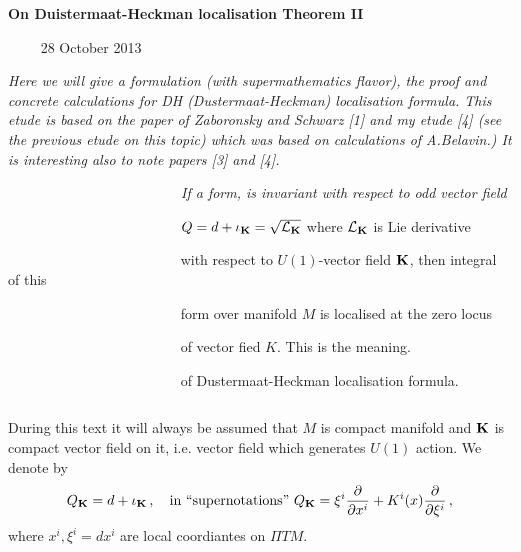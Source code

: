
\def\vare {\varepsilon}
\def\A {{\bf A}}
\def\FF {{\bf F}}
\def\a {\alpha}
\def\K {{\bf K}}
\def\s {{\sigma}}
\def\p{\partial}
\def\vare{{\varepsilon}}
\def\L {{\cal L}}
\def\G {{\Gamma}}
\def\C {{\bf C}}
\def\Z {{\bf Z}}
\def\U  {{\cal U}}
\def\R  {{\bf R}}
\def\E  {{\bf E}}
\def\l {\lambda}
\def\degree {{\bf {\rm degree}\,\,}}
\def \finish {${\,\,\vrule height1mm depth2mm width 8pt}$}
\def \m {\medskip}
\def\r {{\bf r}}
\def\v {{\bf v}}
\def\n {{\bf n}}
\def\b {{\bf b}}
\def\ss  {{\bf s }}
\def\e{{\bf e}}
\def\ac {{\bf a}}
\def \X   {{\bf X}}
\def \Y   {{\bf Y}}
\def \x   {{\bf x}}
\def \y   {{\bf y}}
\def\w {{\omega}} 
\def\wv {{\buildrel \rightarrow\over \omega}}

\def\K{{\bf K}}
\def\locus {\hbox{locus of $\K$}}


\centerline {\bf On Duistermaat-Heckman localisation Theorem II}

  \bigskip

$\qquad$ 28 October 2013

\m

{\it
   Here we will give a formulation (with supermathematics flavor),
the proof and concrete calculations
for DH (Dustermaat-Heckman) localisation formula. This etude is based
on the paper of  Zaboronsky and Schwarz [1] and my etude
[4] (see the previous etude on this topic) which was based on calculations 
of A.Belavin.) It is interesting also to note papers [3] and [4].
}

      \medskip
{\sl
  $\qquad\qquad$$\qquad\qquad$$\qquad\qquad$ If a form, 
  is invariant with respect to odd vector field


$\qquad\qquad$$\qquad\qquad$$\qquad\qquad$  
  $Q=d+\iota_\K=\sqrt {\L_\K}$ 
   where $\L_\K$ is Lie derivative 

$\qquad\qquad$$\qquad\qquad$$\qquad\qquad$ with respect
 to $U(1)$-vector field $\K$, then integral of this 

$\qquad\qquad$$\qquad\qquad$$\qquad\qquad$ form over manifold
  $M$ is localised at the zero locus 

$\qquad\qquad$$\qquad\qquad$$\qquad\qquad$ of vector fied $K$. This is the
 meaning.

$\qquad\qquad$$\qquad\qquad$$\qquad\qquad$ 
of Dustermaat-Heckman localisation formula.

}
 $$ $$

   During this text it will always be assumed that
$M$ is compact manifold  and $\K$ is compact vector field on it, 
i.e. vector field which generates $U(1)$
action. We denote by $$
   Q_\K=d+\iota_\K\,,\quad \hbox
 {in ``supernotations''}\,\,
Q_\K=\xi^i{\p\over \p x^i}+K^i(x){\p \over \p \xi^i}\,,
              $$
where $x^i,\xi^i=dx^i$ are local coordiantes on $\Pi TM$.


